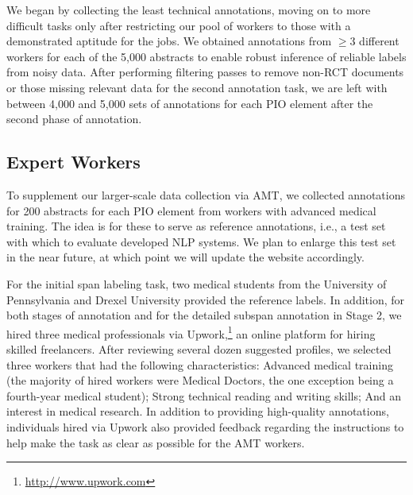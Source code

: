 \documentclass[11pt,a4paper]{article}
\begin{document}
We began by collecting the least technical annotations, moving on to more difficult tasks only after restricting our pool of workers to those with a demonstrated aptitude for the jobs. We obtained annotations from $\geq 3$ different workers for each of the 5,000 abstracts to enable robust inference of reliable labels from noisy data. After performing filtering passes to remove non-RCT documents or those missing relevant data for the second annotation task, we are left with between 4,000 and 5,000 sets of annotations for each PIO element after the second phase of annotation. %

\subsection{Expert Workers}

To supplement our larger-scale data collection via AMT, we collected annotations for 200 abstracts for each PIO element from workers with advanced medical training. The idea is for these to serve as reference annotations, i.e., a test set with which to evaluate developed NLP systems. We plan to enlarge this test set in the near future, at which point we will update the website accordingly. %

For the initial span labeling task, two medical students from the University of Pennsylvania and Drexel University provided the reference labels. %
In addition, for both stages of annotation and for the detailed subspan annotation in Stage 2, we hired three medical professionals via Upwork,\footnote{\url{http://www.upwork.com}} an online platform for hiring skilled freelancers. %
After reviewing several dozen suggested profiles, we selected three workers that had the following characteristics: Advanced medical training (the majority of hired workers were Medical Doctors, the one exception being a fourth-year medical student); Strong technical reading and writing skills; And an interest in medical research. %
In addition to providing high-quality annotations, individuals hired via Upwork also provided feedback regarding the instructions to help make the task as clear as possible for the AMT workers.
\end{document}
